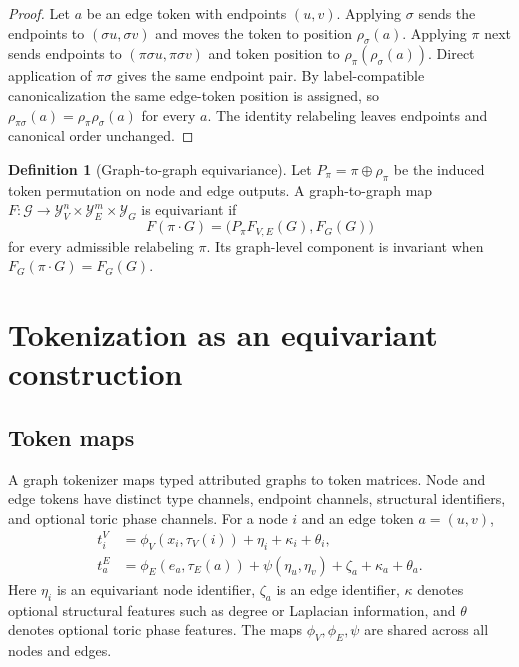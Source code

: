 \documentclass[11pt]{article}
\theoremstyle{definition}
\newtheorem{definition}{Definition}[section]
\theoremstyle{plain}
\theoremstyle{remark}
\numberwithin{equation}{section}
\newcommand{\G}{\mathcal{G}}
\newcommand{\Y}{\mathcal{Y}}
\begin{document}
\begin{proof}
Let $a$ be an edge token with endpoints $(u,v)$.  Applying $\sigma$ sends the endpoints to $(\sigma u,\sigma v)$ and moves the token to position $\rho_\sigma(a)$.  Applying $\pi$ next sends endpoints to $(\pi\sigma u,\pi\sigma v)$ and token position to $\rho_\pi(\rho_\sigma(a))$.  Direct application of $\pi\sigma$ gives the same endpoint pair.  By label-compatible canonicalization the same edge-token position is assigned, so $\rho_{\pi\sigma}(a)=\rho_\pi\rho_\sigma(a)$ for every $a$.  The identity relabeling leaves endpoints and canonical order unchanged.
\end{proof}

\begin{definition}[Graph-to-graph equivariance]
Let $P_\pi=\pi\oplus\rho_\pi$ be the induced token permutation on node and edge outputs.  A graph-to-graph map $F:\G\to\Y_V^n\times\Y_E^m\times\Y_G$ is equivariant if
\begin{equation}
  F(\pi\cdot G)=\bigl(P_\pi F_{V,E}(G),F_G(G)\bigr)
\end{equation}
for every admissible relabeling $\pi$.  Its graph-level component is invariant when $F_G(\pi\cdot G)=F_G(G)$.
\end{definition}

\section{Tokenization as an equivariant construction}

\subsection{Token maps}

A graph tokenizer maps typed attributed graphs to token matrices.  Node and edge tokens have distinct type channels, endpoint channels, structural identifiers, and optional toric phase channels.  For a node $i$ and an edge token $a=(u,v)$,
\begin{align}
  t_i^V &= \phi_V(x_i,\tau_V(i)) + \eta_i + \kappa_i + \theta_i,\\
  t_a^E &= \phi_E(e_a,\tau_E(a)) + \psi(\eta_u,\eta_v) + \zeta_a + \kappa_a + \theta_a.
\end{align}
Here $\eta_i$ is an equivariant node identifier, $\zeta_a$ is an edge identifier, $\kappa$ denotes optional structural features such as degree or Laplacian information, and $\theta$ denotes optional toric phase features.  The maps $\phi_V,\phi_E,\psi$ are shared across all nodes and edges.
\end{document}
